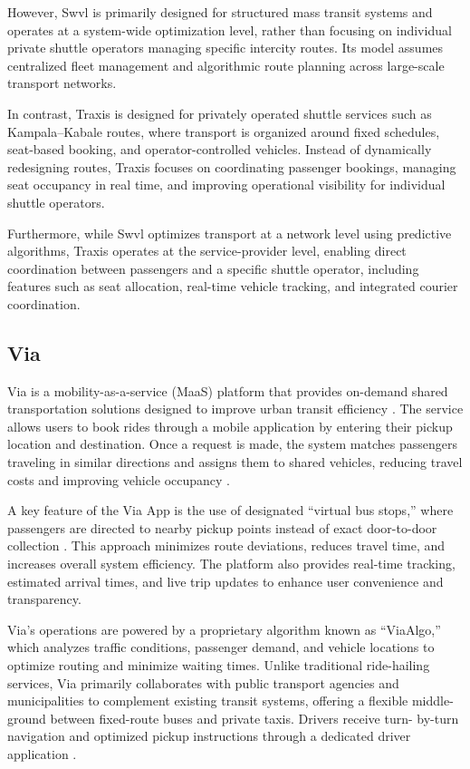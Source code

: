 However, Swvl is primarily designed for structured mass transit systems and
operates at a system-wide optimization level, rather than focusing on individual
private shuttle operators managing specific intercity routes. Its model assumes
centralized fleet management and algorithmic route planning across large-scale
transport networks.


In contrast, Traxis is designed for privately operated shuttle services such as
Kampala–Kabale routes, where transport is organized around fixed schedules,
seat-based booking, and operator-controlled vehicles. Instead of dynamically
redesigning routes, Traxis focuses on coordinating passenger bookings, managing
seat occupancy in real time, and improving operational visibility for individual
shuttle operators.


Furthermore, while Swvl optimizes transport at a network level using predictive
algorithms, Traxis operates at the service-provider level, enabling direct
coordination between passengers and a specific shuttle operator, including
features such as seat allocation, real-time vehicle tracking, and integrated
courier coordination.


\subsection{Via}
Via is a mobility-as-a-service (MaaS) platform that provides on-demand shared
transportation solutions designed to improve urban transit efficiency
\cite{ViaIreland2025}. The service allows users to book rides through a mobile
application by entering their pickup location and destination. Once a request is
made, the system matches passengers traveling in similar directions and assigns
them to shared vehicles, reducing travel costs and improving vehicle occupancy
\cite{via2026howitworks}.


A key feature of the Via App is the use of designated “virtual bus stops,” where
passengers are directed to nearby pickup points instead of exact door-to-door
collection \cite{via2026howitworks}. This approach minimizes route deviations,
reduces travel time, and increases overall system efficiency. The platform also
provides real-time tracking, estimated arrival times, and live trip updates to
enhance user convenience and transparency.


Via’s operations are powered by a proprietary algorithm known as “ViaAlgo,”
which analyzes traffic conditions, passenger demand, and vehicle locations to
optimize routing and minimize waiting times. Unlike traditional ride-hailing
services, Via primarily collaborates with public transport agencies and
municipalities to complement existing transit systems, offering a flexible
middle-ground between fixed-route buses and private taxis. Drivers receive turn-
by-turn navigation and optimized pickup instructions through a dedicated driver
application \cite{via2026howitworks}.


